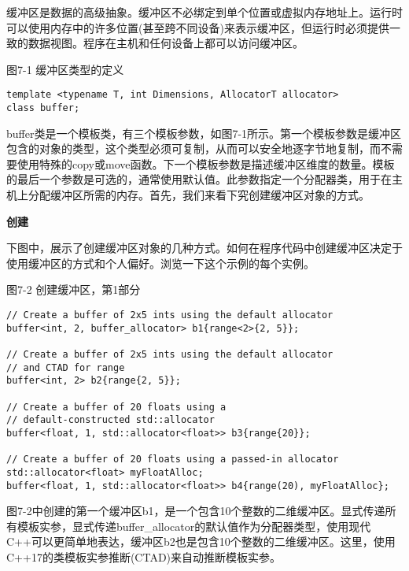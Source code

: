 缓冲区是数据的高级抽象。缓冲区不必绑定到单个位置或虚拟内存地址上。运行时可以使用内存中的许多位置(甚至跨不同设备)来表示缓冲区，但运行时必须提供一致的数据视图。程序在主机和任何设备上都可以访问缓冲区。\par

\hspace*{\fill} \par %
图7-1 缓冲区类型的定义
\begin{lstlisting}[caption={}]
template <typename T, int Dimensions, AllocatorT allocator>
class buffer;
\end{lstlisting}

buffer类是一个模板类，有三个模板参数，如图7-1所示。第一个模板参数是缓冲区包含的对象的类型，这个类型必须可复制，从而可以安全地逐字节地复制，而不需要使用特殊的copy或move函数。下一个模板参数是描述缓冲区维度的数量。模板的最后一个参数是可选的，通常使用默认值。此参数指定一个分配器类，用于在主机上分配缓冲区所需的内存。首先，我们来看下究创建缓冲区对象的方式。\par

\hspace*{\fill} \par %
\textbf{创建}

下图中，展示了创建缓冲区对象的几种方式。如何在程序代码中创建缓冲区决定于使用缓冲区的方式和个人偏好。浏览一下这个示例的每个实例。\par

\hspace*{\fill} \par %
图7-2 创建缓冲区，第1部分
\begin{lstlisting}[caption={}]
// Create a buffer of 2x5 ints using the default allocator
buffer<int, 2, buffer_allocator> b1{range<2>{2, 5}};

// Create a buffer of 2x5 ints using the default allocator 
// and CTAD for range
buffer<int, 2> b2{range{2, 5}};

// Create a buffer of 20 floats using a 
// default-constructed std::allocator
buffer<float, 1, std::allocator<float>> b3{range{20}};

// Create a buffer of 20 floats using a passed-in allocator
std::allocator<float> myFloatAlloc;
buffer<float, 1, std::allocator<float>> b4{range(20), myFloatAlloc};
\end{lstlisting}

图7-2中创建的第一个缓冲区b1，是一个包含10个整数的二维缓冲区。显式传递所有模板实参，显式传递buffer\_allocator的默认值作为分配器类型，使用现代C++可以更简单地表达，缓冲区b2也是包含10个整数的二维缓冲区。这里，使用C++17的类模板实参推断(CTAD)来自动推断模板实参。\par

